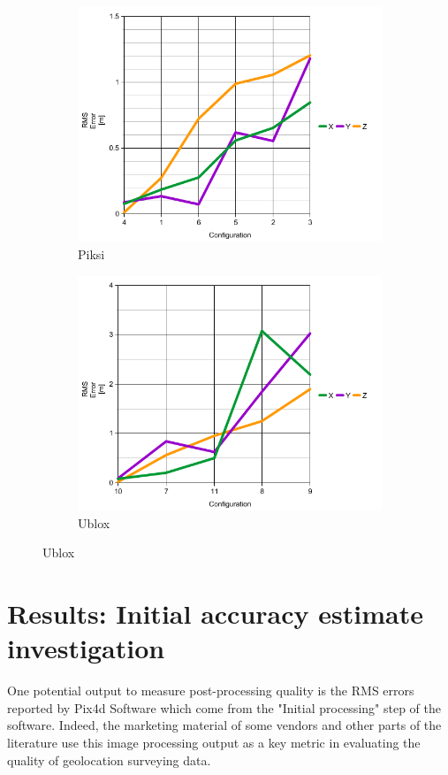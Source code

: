 \documentclass{article}
\begin{document}
\begin{figure}
\centering
\begin{subfigure}{.5\textwidth}
  \centering
  \includegraphics[width=1\linewidth]{images/piksi_rms_error.png}
  \caption{Piksi}
  \label{fig:sub1}
\end{subfigure}%
\begin{subfigure}{.5\textwidth}
  \centering
  \includegraphics[width=1\linewidth]{images/ublox_rms_error.png}
  \caption{Ublox}
  \label{fig:sub2}
\end{subfigure}%
\end{figure}

\section{Results: Initial accuracy estimate investigation}
One potential output to measure post-processing quality is the RMS errors reported by Pix4d Software which come from the "Initial processing" step of the software.  Indeed, the marketing material of some vendors and other parts of the literature use this image processing output as a key metric in evaluating the quality of geolocation surveying data.
\end{document}
